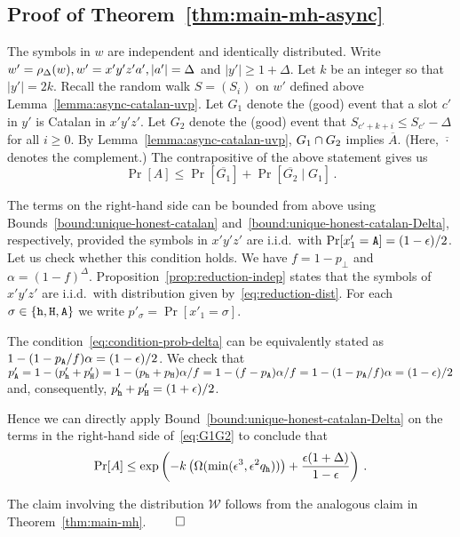 \subsection{Proof of Theorem~\ref{thm:main-mh-async}}
  The symbols in $w$ are independent and identically distributed.
  Write 
  $w' = \rho_\Delta(w), w' = x'y'z'a', |a'| = \Delta$ and $|y'| \geq 1+\Delta$. 
  Let $k$ be an integer so that $|y'| = 2k$. 
  Recall the random walk $S = (S_i)$ on $w'$ 
  defined above Lemma~\ref{lemma:async-catalan-uvp}. 
  Let $G_1$ denote the (good) event that 
  a slot $c'$ in $y'$ is Catalan in $x'y'z'$. 
  Let $G_2$ denote the (good) event that 
  $S_{c' + k + i} \leq S_{c'} - \Delta$ for all $i \geq 0$. 
  By Lemma~\ref{lemma:async-catalan-uvp}, 
  $G_1 \cap G_2$ implies $\overline{A}$. 
  (Here, $\overline{\cdot}$ denotes the complement.) 
  The contrapositive of the above statement gives us 
  \begin{equation}\label{eq:G1G2}
    \Pr[A] \leq \Pr[\overline{G_1}] + \Pr[\overline{G_2} \mid G_1]
    \,.
  \end{equation}

  The terms on the right-hand side can be bounded from above 
  using Bounds~\ref{bound:unique-honest-catalan} 
  and~\ref{bound:unique-honest-catalan-Delta}, respectively, 
  provided the symbols in $x'y'z'$ are i.i.d.\ with 
  $\Pr[x'_1 = \mathtt{A}] = (1 - \epsilon)/2$. 
  Let us check whether this condition holds. 
  We have $f = 1 - p_\perp$ and $\alpha = (1-f)^\Delta$. 
  Proposition~\ref{prop:reduction-indep} 
  states that 
  the symbols of $x'y'z'$ are i.i.d.\ 
  with distribution given by~\eqref{eq:reduction-dist}. 
  For each $\sigma \in \{\mathtt{h}, \mathtt{H}, \mathtt{A}\}$ we write 
  $p'_\sigma = \Pr[x'_1 = \sigma]$. 

  The condition~\eqref{eq:condition-prob-delta} 
  can be equivalently stated as 
  $1 - (1 - p_{\mathtt{A}}/f)\alpha = (1 - \epsilon)/2$. 
  We check that 
  $p'_{\mathtt{A}} 
  = 1 - (p'_{\mathtt{h}} + p'_{\mathtt{H}}) 
  = 1 - (p_{\mathtt{h}} + p_{\mathtt{H}})\alpha/f
  = 1 - (f - p_{\mathtt{A}})\alpha/f
  = 1 - (1 - p_{\mathtt{A}}/f)\alpha
  = (1 - \epsilon)/2
  $ 
  and, consequently, $p'_{\mathtt{h}} + p'_{\mathtt{H}} = (1 + \epsilon)/2$. 

  Hence we can directly apply 
  Bound~\ref{bound:unique-honest-catalan-Delta} 
  on the terms in the right-hand side of~\eqref{eq:G1G2} 
  to conclude that 
  \[
    \Pr[A] \leq \exp\left( 
      -k \left(\Omega(\min(\epsilon^3, \epsilon^2 q_{\mathtt{h}})) \right) 
      + 
      \frac{\epsilon(1+\Delta)}{1 - \epsilon} 
    \right)
    \,.
  \]

  The claim involving the distribution $\mathcal{W}$ 
  follows from the analogous claim in Theorem~\ref{thm:main-mh}. 
  \hfill $\qed$  



